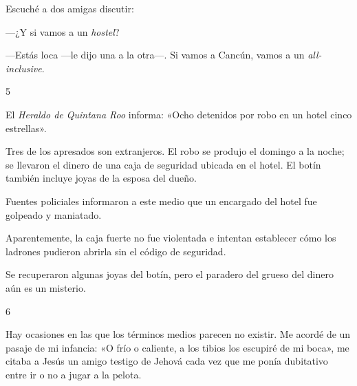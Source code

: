 \documentclass[12pt,twoside,openright,a5paper]{book}
\begin{document}
\nopagebreak

\vspace{0.5cm}

\nopagebreak

Escuché a dos amigas discutir: 

---¿Y si vamos a un \emph{hostel}?

---Estás loca ---le
dijo una a la otra---. Si vamos a Cancún, vamos a un \emph{all-inclusive}.


\vspace{0.5cm}

\hrulefill \hspace{0.1cm}\decofourleft\hspace{0.2cm} 5 \hspace{0.2cm}\decofourright \hspace{0.1cm}\hrulefill

\nopagebreak

\vspace{0.5cm}

\nopagebreak

El \emph{Heraldo de Quintana Roo} informa: «Ocho detenidos por robo en un hotel
cinco estrellas».

Tres de los apresados son extranjeros. El robo se produjo el domingo a la
noche; se llevaron el dinero de una caja de seguridad ubicada en el
hotel. El botín también incluye joyas de la esposa del dueño.

Fuentes policiales informaron a este medio que un encargado del hotel fue
golpeado y maniatado.

Aparentemente, la caja fuerte no fue violentada e intentan establecer cómo
los ladrones pudieron abrirla sin el código de seguridad.

Se recuperaron algunas joyas del botín, pero el paradero del grueso del
dinero aún es un misterio.

\vspace{0.5cm}

\hrulefill \hspace{0.1cm}\decofourleft\hspace{0.2cm} 6 \hspace{0.2cm}\decofourright \hspace{0.1cm}\hrulefill

\nopagebreak

\vspace{0.5cm}

\nopagebreak

Hay ocasiones en las que los términos medios parecen no existir.
Me acordé de un pasaje de mi infancia: «O frío o caliente, a los tibios los escupiré de mi boca», me citaba a Jesús un
amigo testigo de Jehová cada vez que me ponía dubitativo entre ir o no
a jugar a la pelota.
\end{document}
